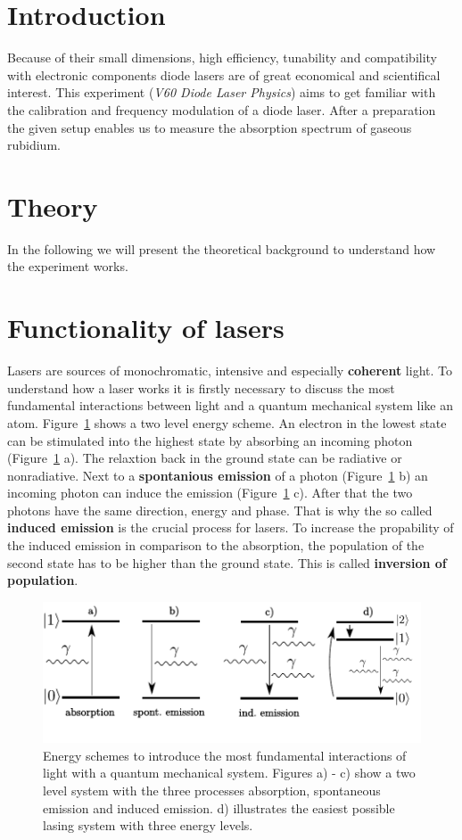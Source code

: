 \setcounter{page}{1}
\section*{Introduction}
Because of their small dimensions, high efficiency, tunability and compatibility with electronic components
diode lasers are of great economical and scientifical interest. This experiment (\emph{V60 Diode Laser Physics}) aims to get familiar
with the calibration and frequency modulation of a diode laser. After a preparation the given setup enables us to measure
the absorption spectrum of gaseous rubidium.

\section{Theory}
In the following we will present the theoretical background to understand how the experiment works.



\section{Functionality of lasers}
Lasers are sources of monochromatic, intensive and especially \textbf{coherent} light.
To understand how a laser works it is firstly necessary to discuss the most fundamental interactions between light and
a quantum mechanical system like an atom. Figure~\ref{fig: two_level} shows a two level energy scheme. An electron in the
lowest state can be stimulated into the highest state by absorbing an incoming photon (Figure~\ref{fig: two_level} a). The relaxtion back in the
ground state can be radiative or nonradiative. Next to a \textbf{spontanious emission} of a photon (Figure~\ref{fig: two_level} b)
an incoming photon can induce the emission (Figure~\ref{fig: two_level} c). After that the two photons have the same direction, energy and phase.
That is why the so called \textbf{induced emission} is the crucial process for lasers. To increase the propability of the induced emission in
comparison to the absorption, the population of the second state has to be higher than the ground state. This is called
\textbf{inversion of population}.

\begin{figure}
  \centering
  \includegraphics[scale = 0.9]{pics/energyscheme.pdf}
  \caption{Energy schemes to introduce the most fundamental interactions of light with a quantum mechanical system. Figures a) - c) show
  a two level system with the three processes absorption, spontaneous emission and induced emission. d) illustrates the easiest possible lasing
  system with three energy levels.}
  \label{fig: two_level}
\end{figure}

